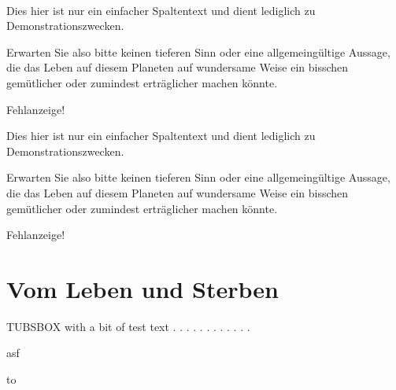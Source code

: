 \documentclass[a4paper,portrait]{scrreprt}
\begin{document}
~
\begin{tubsbox}{0}{1}{1}{8}\footnotesize
  Dies hier ist nur ein einfacher Spaltentext und dient lediglich zu Demonstrationszwecken.
  
  Erwarten Sie also bitte keinen tieferen Sinn oder eine allgemeingültige Aussage, die das Leben auf diesem Planeten auf wundersame Weise ein bisschen gemütlicher oder zumindest erträglicher machen könnte.
  
  Fehlanzeige!
\end{tubsbox}
\begin{tubsbox}{1}{1}{5}{2}
 Dies hier ist nur ein einfacher Spaltentext und dient lediglich zu Demonstrationszwecken.
  
  Erwarten Sie also bitte keinen tieferen Sinn oder eine allgemeingültige Aussage, die das Leben auf diesem Planeten auf wundersame Weise ein bisschen gemütlicher oder zumindest erträglicher machen könnte.
  
  Fehlanzeige!
  \chapter{Vom Leben und Sterben}
  TUBSBOX with a bit of test text . . . . . . . . . . . .
\end{tubsbox}
\begin{tubsbox}[tuBlue20]{1}{3}{5}{2}
asf
\end{tubsbox}

\newpage

\setlength{\fboxsep}{0cm}%
\colorbox{tuSecondaryLight}{%
\parbox{\textwidth}{\vbox to }%
}


\newpage

\makeatletter
\setlength{\columnsep}{\tubspage@columnsep}
\makeatother
\end{document}
